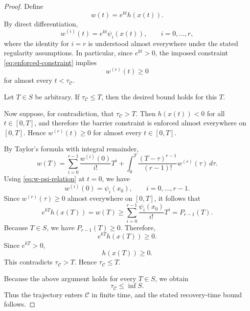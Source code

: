 \documentclass[11pt]{article}
\newcommand{\safeSet}{\mathcal{C}}
\newcommand{\tauC}{\tau_{\mathcal C}}
\begin{document}
\begin{proof}
Define
\begin{equation}
w(t)=e^{kt}h(x(t)).
\label{eq:w-definition}
\end{equation}
By direct differentiation,
\begin{equation}
w^{(i)}(t)
=
e^{kt}\psi_i(x(t)),
\qquad i=0,\dots,r,
\label{eq:w-psi-relation}
\end{equation}
where the identity for $i=r$ is understood almost everywhere under the stated regularity assumptions. In particular, since $e^{kt}>0$, the imposed constraint \eqref{eq:enforced-constraint} implies
\begin{equation}
w^{(r)}(t)\ge0
\label{eq:w-r-nonnegative}
\end{equation}
for almost every $t<\tauC$.

Let $T\in S$ be arbitrary. If $\tauC\le T$, then the desired bound holds for this $T$.

Now suppose, for contradiction, that $\tauC>T$. Then $h(x(t))<0$ for all $t\in[0,T]$, and therefore the barrier constraint is enforced almost everywhere on $[0,T]$. Hence $w^{(r)}(t)\ge0$ for almost every $t\in[0,T]$.

By Taylor's formula with integral remainder,
\begin{equation}
w(T)
=
\sum_{i=0}^{r-1}
\frac{w^{(i)}(0)}{i!}T^i
+
\int_0^T
\frac{(T-\tau)^{r-1}}{(r-1)!}
w^{(r)}(\tau)\,d\tau.
\label{eq:taylor-integral}
\end{equation}
Using \eqref{eq:w-psi-relation} at $t=0$, we have
\begin{equation}
w^{(i)}(0)=\psi_i(x_0),
\qquad i=0,\dots,r-1.
\end{equation}
Since $w^{(r)}(\tau)\ge0$ almost everywhere on $[0,T]$, it follows that
\begin{equation}
e^{kT}h(x(T))
=
w(T)
\ge
\sum_{i=0}^{r-1}
\frac{\psi_i(x_0)}{i!}T^i
=
P_{r-1}(T).
\label{eq:taylor-lower-bound}
\end{equation}
Because $T\in S$, we have $P_{r-1}(T)\ge0$. Therefore,
\begin{equation}
e^{kT}h(x(T))\ge0.
\end{equation}
Since $e^{kT}>0$,
\begin{equation}
h(x(T))\ge0.
\end{equation}
This contradicts $\tauC>T$. Hence $\tauC\le T$.

Because the above argument holds for every $T\in S$, we obtain
\begin{equation}
\tauC\le\inf S.
\end{equation}
Thus the trajectory enters $\safeSet$ in finite time, and the stated recovery-time bound follows.
\end{proof}
\end{document}
